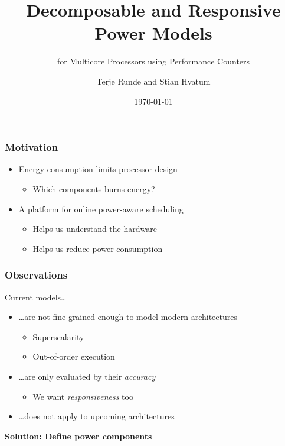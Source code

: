 \documentclass[screen]{beamer}
\title[TDT1, Paper 8]%
{Decomposable and Responsive Power Models}
\subtitle{for Multicore Processors using Performance Counters}
\author[T. Runde and S. Hvatum]{Terje Runde and Stian Hvatum}
\institute[NTNU]{Department of Computer and Information Science}
\date{\today}
\begin{document}
\ntnutitlepage

\begin{frame}
    \frametitle{Motivation}

  \begin{itemize}
      \item Energy consumption limits processor design
          \begin{itemize}
              \item Which components burns energy?
          \end{itemize}

      \item A platform for online power-aware scheduling
          \begin{itemize}
              \item Helps us understand the hardware
              \item Helps us reduce power consumption
          \end{itemize}
  \end{itemize}

\end{frame}

\begin{frame}
    \frametitle{Observations}

    Current models\ldots

    \begin{itemize}
        \item \ldots are not fine-grained enough to model modern architectures
            \begin{itemize}
                \item Superscalarity
                \item Out-of-order execution
            \end{itemize}
        \item \ldots are only evaluated by their \emph{accuracy}
            \begin{itemize}
                \item We want \emph{responsiveness} too
            \end{itemize}
        \item \ldots does not apply to upcoming architectures
    \end{itemize}

    \pause

    \textbf{Solution: Define power components}

\end{frame}
\end{document}
